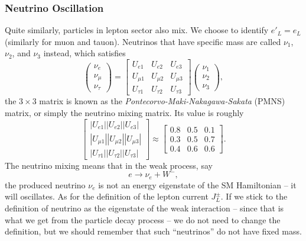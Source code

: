 \documentclass[aps,prb,superscriptaddress,nofootinbib]{revtex4}
\begin{document}
\subsubsection{Neutrino Oscillation}
Quite similarly, particles in lepton sector also mix.
We choose to identify $e'_L = e_L$ (similarly for muon and tauon).
Neutrinos that have specific mass are called $\nu_1$, $\nu_2$, and $\nu_3$ instead, which satisfies
\begin{equation}
	\begin{pmatrix}
		\nu_{e} \\ \nu_{\mu} \\ \nu_{\tau}
	\end{pmatrix} = 
	\begin{bmatrix}
		U_{e 1} & U_{e 2} & U_{e 3} \\
		U_{\mu 1} & U_{\mu 2} & U_{\mu 3} \\
		U_{\tau 1} & U_{\tau 2} & U_{\tau 3}
	\end{bmatrix}
	\begin{pmatrix}
		\nu_{1} \\ \nu_{2} \\ \nu_{3}
	\end{pmatrix},
\end{equation}
the $3 \times 3$ matrix is known as the \textit{Pontecorvo-Maki-Nakagawa-Sakata} (PMNS) matrix, or simply the neutrino mixing matrix.
Its value is roughly
\begin{equation}
	\begin{bmatrix}
		\left|U_{e 1}\right|\left|U_{e 2}\right|\left|U_{e 3}\right| \\
		\left|U_{\mu 1}\right|\left|U_{\mu 2}\right|\left|U_{\mu 3}\right| \\
		\left|U_{\tau 1}\right|\left|U_{\tau 2}\right|\left|U_{\tau 3}\right|
	\end{bmatrix} \approx
	\begin{bmatrix}
		0.8 & 0.5 & 0.1 \\
		0.3 & 0.5 & 0.7 \\
		0.4 & 0.6 & 0.6
	\end{bmatrix}.
\end{equation}
The neutrino mixing means that in the weak process, say
\begin{equation}
	e \rightarrow \nu_e + W^-,
\end{equation}
the produced neutrino $\nu_e$ is not an energy eigenstate of the SM Hamiltonian -- it will oscillates.
As for the definition of the lepton current $J^\pm_L$. 
If we stick to the definition of neutrino as the eigenstate of the weak interaction -- since that is what we get from the particle decay process -- we do not need to change the definition, but we should remember that such ``neutrinos'' do not have fixed mass.
\end{document}

